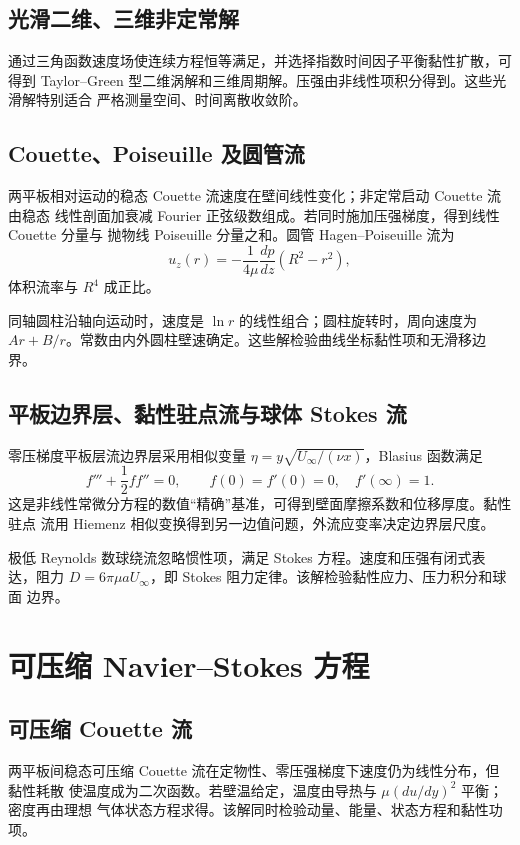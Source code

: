 \documentclass[11pt,a4paper,openany,fontset=none]{ctexbook}
\begin{document}
\subsection{光滑二维、三维非定常解}
通过三角函数速度场使连续方程恒等满足，并选择指数时间因子平衡黏性扩散，可得到
Taylor--Green 型二维涡解和三维周期解。压强由非线性项积分得到。这些光滑解特别适合
严格测量空间、时间离散收敛阶。

\subsection{Couette、Poiseuille 及圆管流}
两平板相对运动的稳态 Couette 流速度在壁间线性变化；非定常启动 Couette 流由稳态
线性剖面加衰减 Fourier 正弦级数组成。若同时施加压强梯度，得到线性 Couette 分量与
抛物线 Poiseuille 分量之和。圆管 Hagen--Poiseuille 流为
\begin{equation}u_z(r)=-\frac1{4\mu}\frac{dp}{dz}(R^2-r^2),
\end{equation}
体积流率与 $R^4$ 成正比。

同轴圆柱沿轴向运动时，速度是 $\ln r$ 的线性组合；圆柱旋转时，周向速度为
$Ar+B/r$。常数由内外圆柱壁速确定。这些解检验曲线坐标黏性项和无滑移边界。

\subsection{平板边界层、黏性驻点流与球体 Stokes 流}
零压梯度平板层流边界层采用相似变量
$\eta=y\sqrt{U_\infty/(\nu x)}$，Blasius 函数满足
\begin{equation}f'''+\frac12 f f''=0,\qquad f(0)=f'(0)=0,\quad f'(\infty)=1.
\end{equation}
这是非线性常微分方程的数值“精确”基准，可得到壁面摩擦系数和位移厚度。黏性驻点
流用 Hiemenz 相似变换得到另一边值问题，外流应变率决定边界层尺度。

极低 Reynolds 数球绕流忽略惯性项，满足 Stokes 方程。速度和压强有闭式表达，阻力
$D=6\pi\mu aU_\infty$，即 Stokes 阻力定律。该解检验黏性应力、压力积分和球面
边界。

\section{可压缩 Navier--Stokes 方程}
\subsection{可压缩 Couette 流}
两平板间稳态可压缩 Couette 流在定物性、零压强梯度下速度仍为线性分布，但黏性耗散
使温度成为二次函数。若壁温给定，温度由导热与 $\mu(du/dy)^2$ 平衡；密度再由理想
气体状态方程求得。该解同时检验动量、能量、状态方程和黏性功项。
\end{document}
